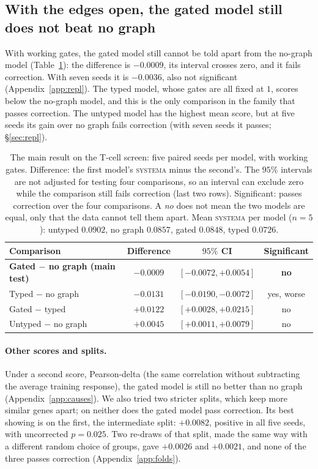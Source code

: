 \documentclass{article}
\begin{document}
\subsection{With the edges open, the gated model still does not beat no graph}
\label{sec:null}

With working gates, the gated model still cannot be told apart from the no-graph model
(Table~\ref{tab:family}): the difference is $-0.0009$, its interval crosses zero, and it fails
correction. With seven seeds it is $-0.0036$, also not significant (Appendix~\ref{app:repl}). The typed
model, whose gates are all fixed at $1$, scores below the no-graph model, and this is
the only comparison in the family that passes correction. The untyped model has the highest mean score,
but at five seeds its gain over no graph fails correction (with seven seeds it passes; \S\ref{sec:repl}).

\begin{table}[t]
\centering
\caption{The main result on the T-cell screen: five paired seeds per model, with working gates.
Difference: the first model's \textsc{systema} minus the second's. The $95\%$ intervals are not adjusted
for testing four comparisons, so an interval can exclude zero while the comparison still fails correction
(last two rows). Significant: passes correction over the four comparisons. A \emph{no} does not mean the
two models are equal, only that the data cannot tell them apart. Mean \textsc{systema} per model
($n{=}5$): untyped $0.0902$, no graph $0.0857$, gated $0.0848$, typed $0.0726$.}
\label{tab:family}
\vspace{2pt}
{\small
\begin{tabular}{@{}lccc@{}}
\toprule
Comparison & Difference & $95\%$ CI & Significant \\
\midrule
\textbf{Gated $-$ no graph (main test)} & $\mathbf{-0.0009}$ & $\mathbf{[-0.0072,+0.0054]}$ & \textbf{no} \\
Typed $-$ no graph & $-0.0131$ & $[-0.0190,-0.0072]$ & yes, worse \\
Gated $-$ typed & $+0.0122$ & $[+0.0028,+0.0215]$ & no \\
Untyped $-$ no graph & $+0.0045$ & $[+0.0011,+0.0079]$ & no \\
\bottomrule
\end{tabular}}
\end{table}

\paragraph{Other scores and splits.} Under a second score, Pearson-delta (the same correlation without
subtracting the average training response), the gated model is still no better than no graph
(Appendix~\ref{app:causes}). We also tried two stricter splits, which keep more similar genes apart; on
neither does the gated model pass correction. Its best showing is on the first, the intermediate split:
$+0.0082$, positive in all five seeds, with uncorrected $p{=}0.025$. Two re-draws of that split, made the
same way with a different random choice of groups, gave $+0.0026$ and $+0.0021$, and none of the three
passes correction (Appendix~\ref{app:folds}).
\end{document}
